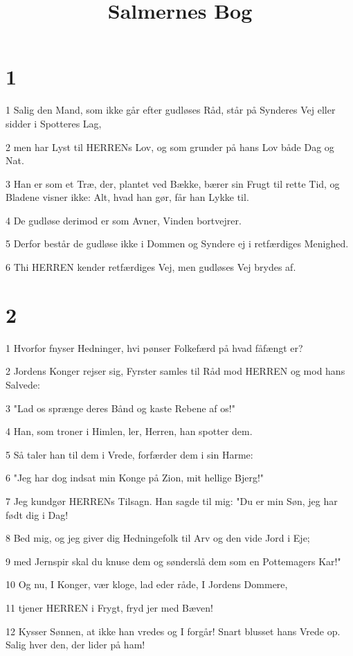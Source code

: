 

\title{Salmernes Bog}


\chapter{1}

\par 1 Salig den Mand, som ikke går efter gudløses Råd, står på Synderes Vej eller sidder i Spotteres Lag,
\par 2 men har Lyst til HERRENs Lov, og som grunder på hans Lov både Dag og Nat.
\par 3 Han er som et Træ, der, plantet ved Bække, bærer sin Frugt til rette Tid, og Bladene visner ikke: Alt, hvad han gør, får han Lykke til.
\par 4 De gudløse derimod er som Avner, Vinden bortvejrer.
\par 5 Derfor består de gudløse ikke i Dommen og Syndere ej i retfærdiges Menighed.
\par 6 Thi HERREN kender retfærdiges Vej, men gudløses Vej brydes af.

\chapter{2}

\par 1 Hvorfor fnyser Hedninger, hvi pønser Folkefærd på hvad fåfængt er?
\par 2 Jordens Konger rejser sig, Fyrster samles til Råd mod HERREN og mod hans Salvede:
\par 3 "Lad os sprænge deres Bånd og kaste Rebene af os!"
\par 4 Han, som troner i Himlen, ler, Herren, han spotter dem.
\par 5 Så taler han til dem i Vrede, forfærder dem i sin Harme:
\par 6 "Jeg har dog indsat min Konge på Zion, mit hellige Bjerg!"
\par 7 Jeg kundgør HERRENs Tilsagn. Han sagde til mig: "Du er min Søn, jeg har født dig i Dag!
\par 8 Bed mig, og jeg giver dig Hedningefolk til Arv og den vide Jord i Eje;
\par 9 med Jernspir skal du knuse dem og sønderslå dem som en Pottemagers Kar!"
\par 10 Og nu, I Konger, vær kloge, lad eder råde, I Jordens Dommere,
\par 11 tjener HERREN i Frygt, fryd jer med Bæven!
\par 12 Kysser Sønnen, at ikke han vredes og I forgår! Snart blusset hans Vrede op. Salig hver den, der lider på ham!

